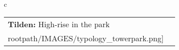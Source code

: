 \begin{table}[H]
        \begin{tabular}{c}
        \begin{tabular}{m{1.5in} m{2in}}
\textbf{Tilden:} {High-rise in the park} & \texttt{[image: \\rootpath/IMAGES/typology\_towerpark.png]}
\end{tabular}\end{tabular}
        \end{table}